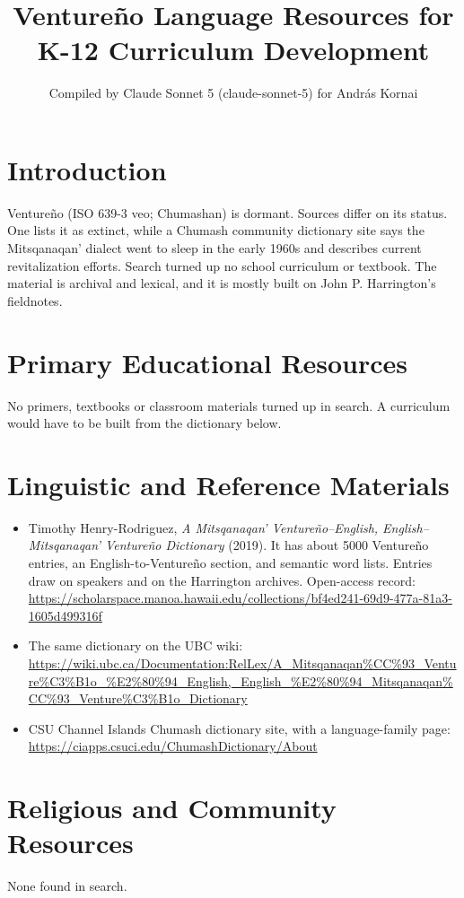 \documentclass[12pt]{article}
\title{Ventureño Language Resources for K-12 Curriculum Development}
\author{Compiled by Claude Sonnet 5 (claude-sonnet-5) for Andr\'as Kornai}
\date{}
\begin{document}
\maketitle

\section{Introduction}
Ventureño (ISO 639-3 veo; Chumashan) is dormant. Sources differ on its status. One lists it as extinct, while a Chumash community dictionary site says the Mitsqanaqan' dialect went to sleep in the early 1960s and describes current revitalization efforts. Search turned up no school curriculum or textbook. The material is archival and lexical, and it is mostly built on John P. Harrington's fieldnotes.

\section{Primary Educational Resources}
No primers, textbooks or classroom materials turned up in search. A curriculum would have to be built from the dictionary below.

\section{Linguistic and Reference Materials}
\begin{itemize}
\item Timothy Henry-Rodriguez, \emph{A Mitsqanaqan' Ventureño--English, English--Mitsqanaqan' Ventureño Dictionary} (2019). It has about 5000 Ventureño entries, an English-to-Ventureño section, and semantic word lists. Entries draw on speakers and on the Harrington archives. Open-access record: \url{https://scholarspace.manoa.hawaii.edu/collections/bf4ed241-69d9-477a-81a3-1605d499316f}
\item The same dictionary on the UBC wiki: \url{https://wiki.ubc.ca/Documentation:RelLex/A_Mitsqanaqan%CC%93_Venture%C3%B1o_%E2%80%94_English,_English_%E2%80%94_Mitsqanaqan%CC%93_Venture%C3%B1o_Dictionary}
\item CSU Channel Islands Chumash dictionary site, with a language-family page: \url{https://ciapps.csuci.edu/ChumashDictionary/About}
\end{itemize}

\section{Religious and Community Resources}
None found in search.
\end{document}
